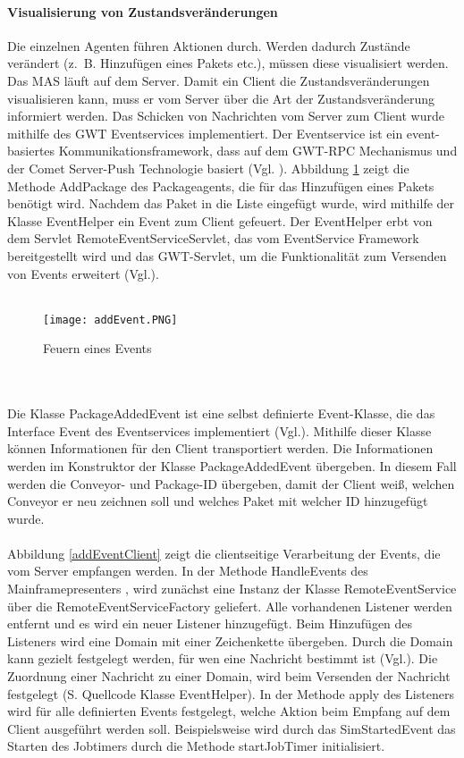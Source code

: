 \paragraph{Visualisierung von Zustandsveränderungen}
Die einzelnen Agenten führen Aktionen durch. Werden dadurch Zustände verändert (z.~B. Hinzufügen eines Pakets etc.), müssen diese visualisiert werden. Das MAS läuft auf dem Server. Damit ein Client die Zustandsveränderungen visualisieren kann, muss er vom Server über die Art der Zustandsveränderung informiert werden. Das Schicken von Nachrichten vom Server zum Client wurde mithilfe des GWT Eventservices implementiert. Der Eventservice ist ein event-basiertes Kommunikationsframework, dass auf dem GWT-RPC Mechanismus und der Comet Server-Push Technologie basiert (Vgl. \cite{gwteventservice}). Abbildung \ref{addEvent} zeigt die Methode AddPackage des Packageagents, die für das Hinzufügen eines Pakets benötigt wird. Nachdem das Paket in die Liste eingefügt wurde, wird mithilfe der Klasse EventHelper ein Event zum Client gefeuert. Der EventHelper erbt von dem Servlet RemoteEventServiceServlet, das vom EventService Framework bereitgestellt wird und das GWT-Servlet, um die Funktionalität zum Versenden von Events erweitert (Vgl.\cite{gwteventservice}). 
\\\\
\begin{figure}[h!]
	\centering
		\texttt{[image: addEvent.PNG]}        
		\caption{Feuern eines Events}
	\label{addEvent}
\end{figure}
\\\\
Die Klasse PackageAddedEvent ist eine selbst definierte Event-Klasse, die das Interface Event des Eventservices implementiert (Vgl.\cite{gwteventservice}). Mithilfe dieser Klasse können Informationen für den Client transportiert werden. Die Informationen werden im Konstruktor der Klasse PackageAddedEvent übergeben. In diesem Fall werden die Conveyor- und Package-ID übergeben, damit der Client weiß, welchen Conveyor er neu zeichnen soll und welches Paket mit welcher ID hinzugefügt wurde.
\\\\
Abbildung \ref{addEventClient} zeigt die clientseitige Verarbeitung der Events, die vom Server empfangen werden. In der Methode HandleEvents des Mainframepresenters , wird zunächst eine Instanz der Klasse RemoteEventService über die RemoteEventServiceFactory geliefert. Alle vorhandenen Listener werden entfernt und es wird ein neuer Listener hinzugefügt. Beim Hinzufügen des Listeners wird eine Domain mit einer Zeichenkette übergeben. Durch die Domain kann gezielt festgelegt werden, für wen eine Nachricht bestimmt ist (Vgl.\cite{gwteventservice}). Die Zuordnung einer Nachricht zu einer Domain, wird beim Versenden der Nachricht festgelegt (S. Quellcode Klasse EventHelper). In der Methode apply des Listeners wird für alle definierten Events festgelegt, welche Aktion beim Empfang auf dem Client ausgeführt werden soll. Beispielsweise wird durch das SimStartedEvent das Starten des Jobtimers durch die Methode startJobTimer initialisiert.
